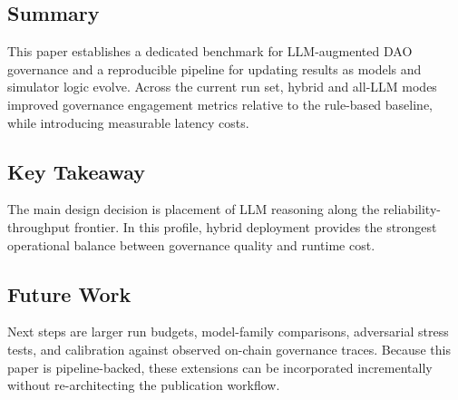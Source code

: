
\subsection{Summary}

This paper establishes a dedicated benchmark for LLM-augmented DAO governance and a
reproducible pipeline for updating results as models and simulator logic evolve.
Across the current run set, hybrid and all-LLM modes improved governance engagement
metrics relative to the rule-based baseline, while introducing measurable latency
costs.

\subsection{Key Takeaway}

The main design decision is placement of LLM reasoning along the reliability-throughput
frontier. In this profile, hybrid deployment provides the strongest operational
balance between governance quality and runtime cost.

\subsection{Future Work}

Next steps are larger run budgets, model-family comparisons, adversarial stress tests,
and calibration against observed on-chain governance traces. Because this paper is
pipeline-backed, these extensions can be incorporated incrementally without
re-architecting the publication workflow.

